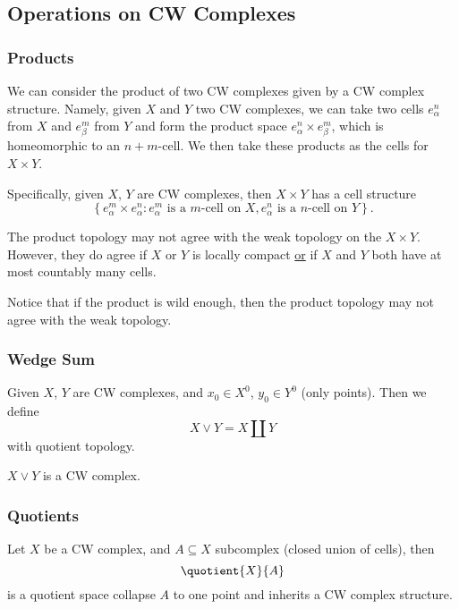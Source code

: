 \subsection{Operations on CW Complexes}
\subsubsection{Products}
We can consider the product of two CW complexes given by a CW complex structure. Namely, given \(X\) and \(Y\)
two CW complexes, we can take two cells \(e^n_{\alpha }\) from \(X\) and \(e^m_{\beta }\) from \(Y\) and
form the product space \(e^n_{\alpha }\times e^m_{\beta }\), which is homeomorphic to an \(n+m\)-cell. We then
take these products as the cells for \(X\times Y\).

Specifically, given \(X\), \(Y\) are CW complexes, then \(X\times Y\) has a cell structure
\[
	\left\{e_{\alpha}^m \times e_{\alpha}^n\colon e^m_{\alpha}\text{ is a \(m\)-cell on \(X\)}, e^n_{\alpha}\text{ is a \(n\)-cell on \(Y\)}\right\}.
\]
\begin{remark}
	The product topology may not agree with the weak topology on the \(X\times Y\). However, they do agree if
	\(X\) or \(Y\) is locally compact \underline{or} if \(X\) and \(Y\) both have at most countably many cells.
\end{remark}

\begin{note}
	Notice that if the product is wild enough, then the product topology may not agree with the weak topology.
\end{note}
\subsubsection{Wedge Sum}
Given \(X\), \(Y\) are CW complexes, and \(x_0\in X^0\), \(y_0\in Y^0\) (only points). Then we define
\[
	X\vee Y = X\coprod Y
\]
with quotient topology.
\begin{remark}
	\(X\lor Y\) is a CW complex.
\end{remark}

\subsubsection{Quotients}
Let \(X\) be a CW complex, and \(A\subseteq X\) subcomplex (closed union of cells), then
\[
	\quotient{X}{A}
\]
is a quotient space collapse \(A\) to one point and inherits a CW complex structure.

